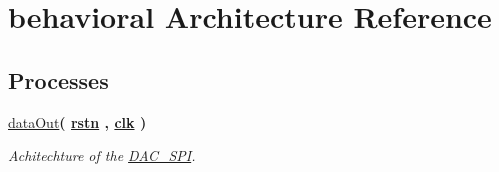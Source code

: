 \hypertarget{classDAC__SPI_1_1behavioral}{\section{behavioral Architecture Reference}
\label{classDAC__SPI_1_1behavioral}
}
\subsection*{Processes}
 \begin{DoxyCompactItemize}
\item 
\hyperlink{classDAC__SPI_1_1behavioral_a242d986315a0356a0eab33f27aaf9ee0}{data\-Out}{\bfseries  ( {\bfseries {\bfseries \hyperlink{classDAC__SPI_aba021aec4b477b89079bb58ccadcc67e}{rstn}} \textcolor{vhdlchar}{ }\textcolor{vhdlchar}{ }\textcolor{vhdlchar}{ }} , {\bfseries {\bfseries \hyperlink{classDAC__SPI_a8120037e0ee47c35ba2d79242209c72e}{clk}} \textcolor{vhdlchar}{ }} )}
\begin{DoxyCompactList}\small\item\em Achitechture of the \hyperlink{classDAC__SPI}{D\-A\-C\-\_\-\-S\-P\-I}. \end{DoxyCompactList}\end{DoxyCompactItemize}
